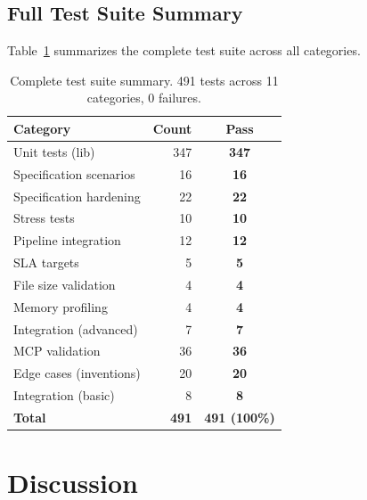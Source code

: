 \documentclass[10pt, twocolumn]{article}
\begin{document}
\subsection{Full Test Suite Summary}

Table~\ref{tab:suite} summarizes the complete test suite across all categories.

\begin{table}[t]
\caption{Complete test suite summary. 491 tests across 11 categories, 0 failures.}
\label{tab:suite}
\centering
\small
\begin{tabular}{@{}lrc@{}}
\toprule
\textbf{Category} & \textbf{Count} & \textbf{Pass} \\
\midrule
Unit tests (lib) & 347 & \textcolor{amgreen}{\textbf{347}} \\
Specification scenarios & 16 & \textcolor{amgreen}{\textbf{16}} \\
Specification hardening & 22 & \textcolor{amgreen}{\textbf{22}} \\
Stress tests & 10 & \textcolor{amgreen}{\textbf{10}} \\
Pipeline integration & 12 & \textcolor{amgreen}{\textbf{12}} \\
SLA targets & 5 & \textcolor{amgreen}{\textbf{5}} \\
File size validation & 4 & \textcolor{amgreen}{\textbf{4}} \\
Memory profiling & 4 & \textcolor{amgreen}{\textbf{4}} \\
Integration (advanced) & 7 & \textcolor{amgreen}{\textbf{7}} \\
MCP validation & 36 & \textcolor{amgreen}{\textbf{36}} \\
Edge cases (inventions) & 20 & \textcolor{amgreen}{\textbf{20}} \\
Integration (basic) & 8 & \textcolor{amgreen}{\textbf{8}} \\
\midrule
\textbf{Total} & \textbf{491} & \textbf{491 (100\%)} \\
\bottomrule
\end{tabular}
\end{table}


\section{Discussion}
\label{sec:discussion}
\end{document}
